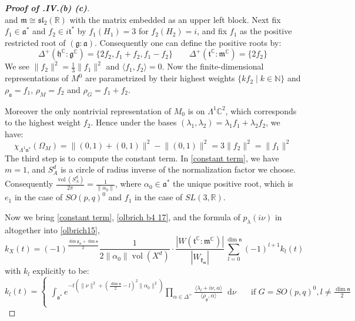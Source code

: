 \documentclass[11pt]{report}
\theoremstyle{definition}
\theoremstyle{plain}
\DeclareMathOperator{\vol}{vol}
\newcommand{\nat}{\mathbb{N}}
\newcommand{\real}{\mathbb{R}}
\newcommand{\complex}{\mathbb{C}}
\newcommand{\brac}[1]{\langle #1 \rangle}
\newcommand{\norm}[1]{\lVert #1 \rVert}
\newcommand{\mass}[1]{\mathop{}\mathrm{d}{#1}}
\newcommand{\Lie}[1]{\mathfrak{#1}}
\begin{document}
\begin{proof}[\textbf{Proof of .IV.(b) (c)}]
\begin{equation}
\end{equation}
and $\Lie{m}\cong \Lie{sl}_2(\real)$ with the matrix embedded as an upper left block. Next fix $f_1\in \Lie{a}^*$ and $f_2\in i\Lie{t}^*$ by $f_1(H_1)=3$ for $f_2(H_2)=i$, and fix $f_1$ as the positive restricted root of $(\Lie{g}:\Lie{a})$. Consequently one can define the positive roots by:
\begin{equation}
\Delta^+(\Lie{h}^\complex:\Lie{g}^\complex)=\{2f_2, f_1+f_2, f_1-f_2\} \qquad \Delta^+(\Lie{t}^\complex:\Lie{m}^\complex)=\{2f_2\}
\end{equation}
We see $\norm{f_2}^2=\frac{1}{3}\norm{f_1}^2$ and $\brac{f_1, f_2}=0$. Now the finite-dimensional representations of $M^0$ are parametrized by their highest weights $\{kf_2\mid k\in \nat\}$ and $\rho_{\Lie{a}}=f_1$,  $\rho_M=f_2$ and $\rho_{G}=f_1+f_2$.
\par Moreover the only nontrivial representation of $M_0$ is on $\Lambda^1\complex^2$, which corresponds to the highest weight $f_2$. Hence under the bases $(\lambda_1, \lambda_2)=\lambda_1f_1+\lambda_2f_2$, we have:
\begin{equation}
\chi_{\Lambda^1\Lie{n}^*}(\Omega_M)=\norm{(0,1)+(0,1)}^2-\norm{(0,1)}^2=3\norm{f_2}^2=\norm{f_1}^2
\end{equation}
The third step is to compute the constant term. In \ref{constant term}, we have $m=1$, and $S^d_A$ is a circle of radius inverse of the normalization factor we choose. Consequently $\frac{\vol(S^d_A)}{2\pi}=\frac{1}{\norm{\alpha_0}}$, where $\alpha_0\in \Lie{a}^*$ the unique positive root, which is $e_1$ in the case of $SO(p,q)^0$ and $f_1$ in the case of $SL(3,\real)$.
\par Now we bring \ref{constant term}, \ref{olbrich b4 17}, and the formula of $p_\lambda(i\nu)$ in  altogether into \ref{olbrich15},
\begin{equation}\label{olbrich234}
k_X(t)=(-1)^{\frac{\dim\Lie{p_m}+\dim\Lie{n}}{2}}\frac{1}{2\norm{\alpha_0}\vol(X^d)}\cdot\frac{|W(\Lie{t}^\complex:\Lie{m}^\complex)|}{|W_\Lie{k_m}|}\sum^{\dim \Lie{n}}_{l=0}(-1)^{l+1}k_l(t)
\end{equation}
with $k_l$ explicitly to be:
\begin{equation}\label{olbrich pl}
k_l(t)=\begin{cases}
\int_{\Lie{a}^*}e^{-t(\norm{\nu}^2+(\frac{\dim\Lie{n}}{2}-l)^2\norm{\alpha_0}^2)}\prod_{\alpha\in\Delta^+}\frac{\brac{\lambda_l+i\nu, \alpha}}{\brac{\rho_{\Lie{g}},\alpha}}\mass{\nu}\quad &\text{if $G=SO(p,q)^0, l\neq \frac{\dim\Lie{n}}{2}$}\\

\end{cases}
\end{equation}
\end{proof}
\end{document}
